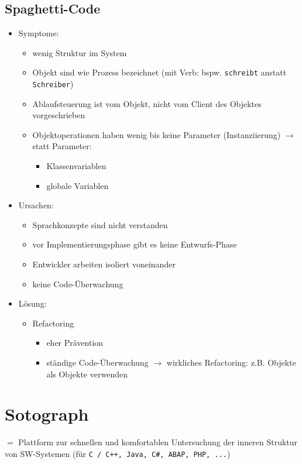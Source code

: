 \subsection{Spaghetti-Code}
\begin{itemize}
\item Symptome:
\begin{itemize}
\item wenig Struktur im System
\item Objekt sind wie Prozess bezeichnet (mit Verb: bspw. \texttt{schreibt} anstatt \texttt{Schreiber})
\item Ablaufsteuerung ist vom Objekt, nicht vom Client des Objektes vorgeschrieben
\item Objektoperationen haben wenig bis keine Parameter (Instanziierung) $\to$ statt Parameter: 
\begin{itemize}
\item Klassenvariablen
\item globale Variablen
\end{itemize}
\end{itemize}
\item Ursachen:
\begin{itemize}
\item Sprachkonzepte sind nicht verstanden
\item vor Implementierungsphase gibt es keine Entwurfs-Phase
\item Entwickler arbeiten isoliert voneinander
\item keine Code-Überwachung
\end{itemize}
\item Lösung:
\begin{itemize}
\item Refactoring
\begin{itemize}
\item eher Prävention
\item ständige Code-Überwachung $\to$ wirkliches Refactoring: z.B. Objekte als Objekte verwenden
\end{itemize}
\end{itemize}
\end{itemize}

\section{Sotograph}
$=$ Plattform zur schnellen und komfortablen Untersuchung der inneren Struktur von SW-Systemen (für \lstinline`C / C++, Java, C#, ABAP, PHP, ...`)

\begin{center}
\end{center}













